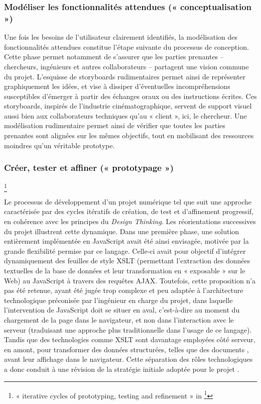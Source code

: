 \subsubsection{Modéliser les fonctionnalités attendues (« conceptualisation »)}

Une fois les besoins de l’utilisateur clairement identifiés, la modélisation des fonctionnalités attendues constitue l’étape suivante du processus de conception. Cette phase permet notamment de s’assurer que les parties prenantes – chercheurs, ingénieurs et autres collaborateurs – partagent une vision commune du projet. L’esquisse de storyboards rudimentaires permet ainsi de représenter graphiquement les idées, et vise à dissiper d’éventuelles incompréhensions susceptibles d’émerger à partir des échanges oraux ou des instructions écrites. Ces storyboards, inspirés de l’industrie cinématographique, servent de support visuel aussi bien aux collaborateurs techniques qu’au « client », ici, le chercheur. Une modélisation rudimentaire permet ainsi de vérifier que toutes les parties prenantes sont alignées sur les mêmes objectifs, tout en mobilisant des ressources moindres qu’un véritable prototype.

\subsubsection{Créer, tester et affiner (« prototypage »)}\footnote{« iterative cycles of prototyping, testing and refinement » in \footcite[p.4]{brown_design_2008}}

Le processus de développement d’un projet numérique tel que \pense suit une approche caractérisée par des cycles itératifs de création, de test et d’affinement progressif, en cohérence avec les principes du \textit{Design Thinking}. 
Les réorientations successives du projet illustrent cette dynamique. Dans une première phase, une solution entièrement implémentée en JavaScript avait été ainsi envisagée, motivée par la grande flexibilité permise par ce langage. Celle-ci avait pour objectif d’intégrer dynamiquement des feuilles de style XSLT (permettant l’extraction des données textuelles de la base de données \tei et leur transformation en \html « exposable » sur le Web) au JavaScript à travers des requêtes AJAX. Toutefois, cette proposition n’a pas été retenue, ayant été jugée trop complexe et peu adaptée à l’architecture technologique préconisée par l’ingénieur en charge du projet, dans laquelle l’intervention de JavaScript doit se situer en aval, c’est-à-dire au moment du chargement de la page dans le navigateur, et non dans l’interaction avec le serveur (traduisant une approche plus traditionnelle dans l’usage de ce langage). Tandis que des technologies comme XSLT sont davantage employées côté serveur, en amont, pour transformer des données structurées, telles que des documents \xml, avant leur affichage dans le navigateur. Cette séparation des rôles technologiques a donc conduit à une révision de la stratégie initiale adoptée pour le projet \pense. 
\newline
{}\\

